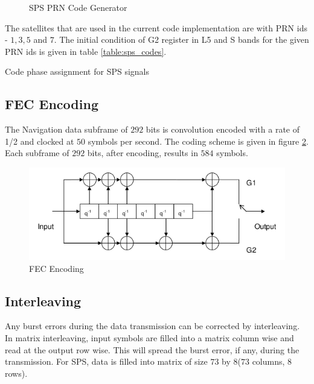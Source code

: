 \begin{figure}[!ht]
	\centering
	
	\caption{SPS PRN Code Generator}
	\label{figure:codeGen}
\end{figure}

\noindent The satellites that are used in the current code implementation are with PRN ids - $1,3,5$ and $7$. The initial condition of G2 register in L5 and S bands for the given PRN ids is given in table \ref{table:sps_codes}.

\begin{table}[h]

\vspace{3mm}
\caption{Code phase assignment for SPS signals}
\label{table:sps_codes}
\end{table}

\subsection{FEC Encoding}
The Navigation data subframe of $292$ bits is convolution encoded with a rate of 1/2 and clocked at $50$ symbols per second. The coding scheme is given in figure \ref{fig:FEC}. Each subframe of $292$ bits, after encoding, results in $584$ symbols.

\begin{figure}[ht]
\centering
\includegraphics[width=\columnwidth]{figs/FEC.png}
\centering
\captionsetup{justification=centering}
\caption{FEC Encoding}
\label{fig:FEC}
\end{figure}

\subsection{Interleaving}
Any burst errors during the data transmission can be corrected by interleaving. In matrix interleaving, input symbols are filled into a matrix column wise and read at the output row wise. This will spread the burst error, if any, during the transmission. For SPS, data is filled into matrix of size $73$ by $8$($73$ columns, $8$ rows).
